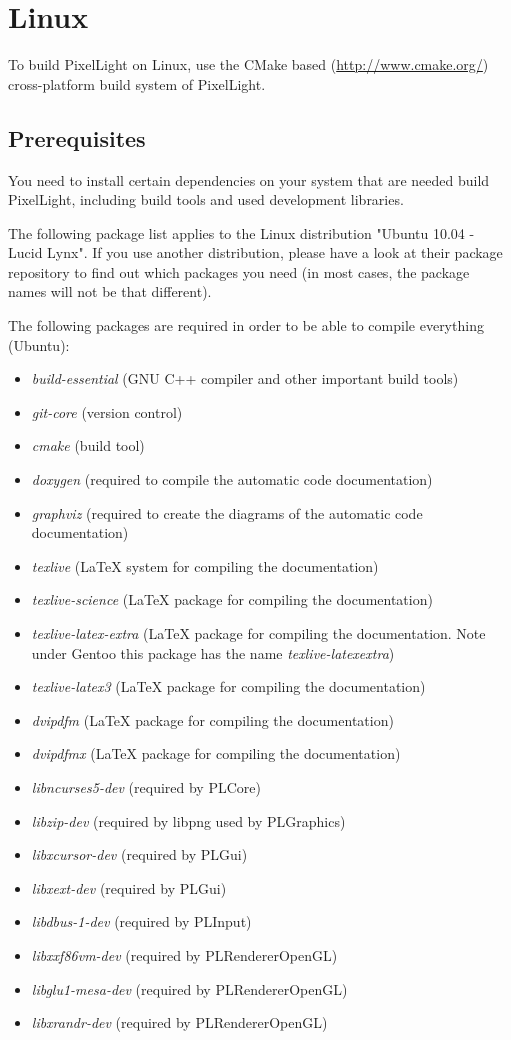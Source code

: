 \chapter{Linux}
To build PixelLight on Linux, use the CMake based (\url{http://www.cmake.org/}) cross-platform build system of PixelLight.




\section{Prerequisites}
You need to install certain dependencies on your system that are needed build PixelLight, including build tools and used development libraries.

The following package list applies to the Linux distribution "Ubuntu 10.04 - Lucid Lynx". If you use another distribution, please have a look at their package repository to find out which packages you need (in most cases, the package names will not be that different).

The following packages are required in order to be able to compile everything (Ubuntu):
\begin{itemize}
\item{\emph{build-essential} (GNU C++ compiler and other important build tools)}
\item{\emph{git-core} (version control)}
\item{\emph{cmake} (build tool)}
\item{\emph{doxygen} (required to compile the automatic code documentation)}
\item{\emph{graphviz} (required to create the diagrams of the automatic code documentation)}
\item{\emph{texlive} (\LaTeX{} system for compiling the documentation)}
\item{\emph{texlive-science} (\LaTeX{} package for compiling the documentation)}
\item{\emph{texlive-latex-extra} (\LaTeX{} package for compiling the documentation. Note under Gentoo this package has the name \emph{texlive-latexextra})}
\item{\emph{texlive-latex3} (\LaTeX{} package for compiling the documentation)}
\item{\emph{dvipdfm} (\LaTeX{} package for compiling the documentation)}
\item{\emph{dvipdfmx} (\LaTeX{} package for compiling the documentation)}
\item{\emph{libncurses5-dev} (required by PLCore)}
\item{\emph{libzip-dev} (required by libpng used by PLGraphics)}
\item{\emph{libxcursor-dev} (required by PLGui)}
\item{\emph{libxext-dev} (required by PLGui)}
\item{\emph{libdbus-1-dev} (required by PLInput)}
\item{\emph{libxxf86vm-dev} (required by PLRendererOpenGL)}
\item{\emph{libglu1-mesa-dev} (required by PLRendererOpenGL)}
\item{\emph{libxrandr-dev} (required by PLRendererOpenGL)}
\end{itemize}

